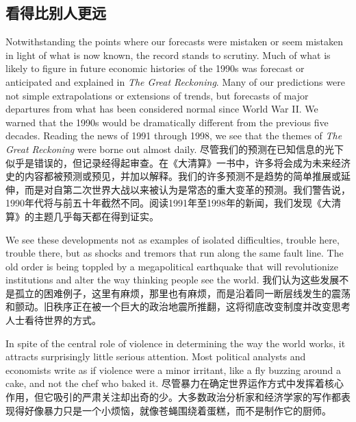 \subsection{看得比别人更远}

\begin{Parallel}{97mm}{45mm}

 \ParallelLText
  {Notwithstanding the points where our forecasts were mistaken or seem mistaken in light of what is now known, the record stands to scrutiny. Much of what is likely to figure in future economic histories of the 1990s was forecast or anticipated and explained in \emph{The Great Reckoning}. Many of our predictions were not simple extrapolations or extensions of trends, but forecasts of major departures from what has been considered normal since World War II. We warned that the 1990s would be dramatically different from the previous five decades. Reading the news of 1991 through 1998, we see that the themes of \emph{The Great Reckoning} were borne out almost daily. }  
  \ParallelRText
  {\small 尽管我们的预测在已知信息的光下似乎是错误的，但记录经得起审查。在《大清算》一书中，许多将会成为未来经济史的内容都被预测或预见，并加以解释。我们的许多预测不是趋势的简单推展或延伸，而是对自第二次世界大战以来被认为是常态的重大变革的预测。我们警告说，1990年代将与前五十年截然不同。阅读1991年至1998年的新闻，我们发现《大清算》的主题几乎每天都在得到证实。}
  \ParallelPar



  \ParallelLText
  {We see these developments not as examples of isolated difficulties, trouble here, trouble there, but as shocks and tremors that run along the same fault line. The old order is being toppled by a megapolitical earthquake that will revolutionize institutions and alter the way thinking people see the world.   }  
  \ParallelRText
  {\small 我们认为这些发展不是孤立的困难例子，这里有麻烦，那里也有麻烦，而是沿着同一断层线发生的震荡和颤动。旧秩序正在被一个巨大的政治地震所推翻，这将彻底改变制度并改变思考人士看待世界的方式。}
  \ParallelPar



  \ParallelLText
  {In spite of the central role of violence in determining the way the world works, it attracts surprisingly little serious attention. Most political analysts and economists write as if violence were a minor irritant, like a fly buzzing around a cake, and not the chef who baked it.  }  
  \ParallelRText
  {\small 尽管暴力在确定世界运作方式中发挥着核心作用，但它吸引的严肃关注却出奇的少。大多数政治分析家和经济学家的写作都表现得好像暴力只是一个小烦恼，就像苍蝇围绕着蛋糕，而不是制作它的厨师。}
  \ParallelPar


\end{Parallel}
